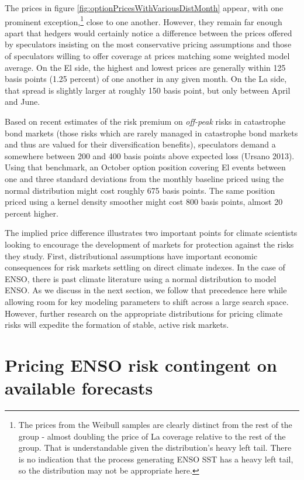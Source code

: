 \documentclass[article]{jss}
\begin{document}
The prices in figure \ref{fig:optionPricesWithVariousDistMonth} appear,
with one prominent exception,\footnote{The prices from the Weibull
  samples are clearly distinct from the rest of the group - almost
  doubling the price of La  coverage relative to the rest
  of the group. That is understandable given the distribution's heavy
  left tail. There is no indication that the process generating ENSO SST
  has a heavy left tail, so the distribution may not be appropriate
  here.} close to one another. However, they remain far enough apart
that hedgers would certainly notice a difference between the prices
offered by speculators insisting on the most conservative pricing
assumptions and those of speculators willing to offer coverage at prices
matching some weighted model average. On the El  side, the
highest and lowest prices are generally within 125 basis points (1.25
percent) of one another in any given month. On the La 
side, that spread is slightly larger at roughly 150 basis point, but
only between April and June.

Based on recent estimates of the risk premium on \emph{off-peak} risks
in catastrophe bond markets (those risks which are rarely managed in
catastrophe bond markets and thus are valued for their diversification
benefits), speculators demand a somewhere between 200 and 400 basis
points above expected loss (Ursano 2013). Using that benchmark, an
October option position covering El  events between one and
three standard deviations from the monthly baseline priced using the
normal distribution might cost roughly 675 basis points. The same
position priced using a kernel density smoother might cost 800 basis
points, almost 20 percent higher.

The implied price difference illustrates two important points for
climate scientists looking to encourage the development of markets for
protection against the risks they study. First, distributional
assumptions have important economic consequences for risk markets
settling on direct climate indexes. In the case of ENSO, there is past
climate literature using a normal distribution to model ENSO. As we
discuss in the next section, we follow that precedence here while
allowing room for key modeling parameters to shift across a large search
space. However, further research on the appropriate distributions for
pricing climate risks will expedite the formation of stable, active risk
markets.

\section{Pricing ENSO risk contingent on available
forecasts}\label{pricing-enso-risk-contingent-on-available-forecasts}
\end{document}
